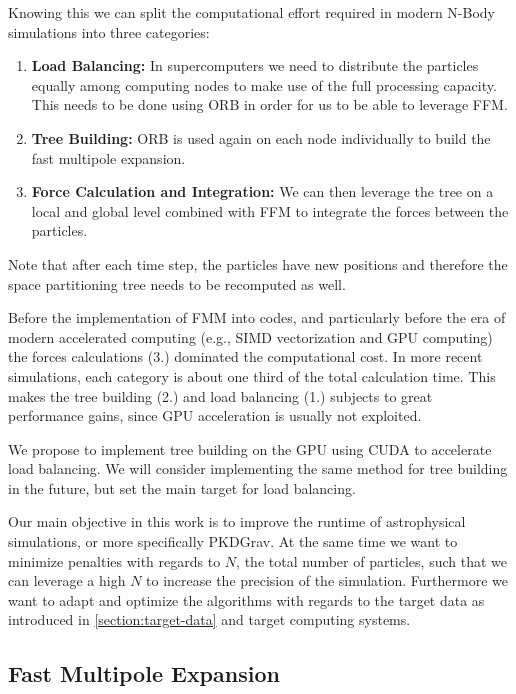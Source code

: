 \documentclass[]{article}
\begin{document}
Knowing this we can split the computational effort required in modern N-Body simulations into three categories:

\begin{enumerate}
	\item \textbf{Load Balancing:} In supercomputers we need to distribute the particles equally among computing nodes to make use of the full processing capacity. This needs to be done using ORB in order for us to be able to leverage FFM.
	\item \textbf{Tree Building:} ORB is used again on each node individually to build the fast multipole expansion.
	\item \textbf{Force Calculation and Integration:} We can then leverage the tree on a local and global level combined with FFM to integrate the forces between the particles.
\end{enumerate}

Note that after each time step, the particles have new positions and therefore the space partitioning tree needs to be recomputed as well.

Before the implementation of FMM into codes, and particularly before the era of modern accelerated computing (e.g., SIMD vectorization and GPU computing) the forces calculations (3.) dominated the computational cost. In more recent simulations, each category is about one third of the total calculation time\cite{2017ComAC...4....2P}. This makes the tree building (2.) and load balancing (1.) subjects to great performance gains, since GPU acceleration is usually not exploited. 

We propose to implement tree building on the GPU using CUDA to accelerate load balancing. We will consider implementing the same method for tree building in the future, but set the main target for load balancing.

Our main objective in this work is to improve the runtime of astrophysical simulations, or more specifically PKDGrav. At the same time we want to minimize penalties with regards to $N$, the total number of particles, such that we can leverage a high $N$ to increase the precision of the simulation. Furthermore we want to adapt and optimize the algorithms with regards to the target data as introduced in \ref{section:target-data} and target computing systems.


\subsection{Fast Multipole Expansion} \label{sec:multipole}
\end{document}
